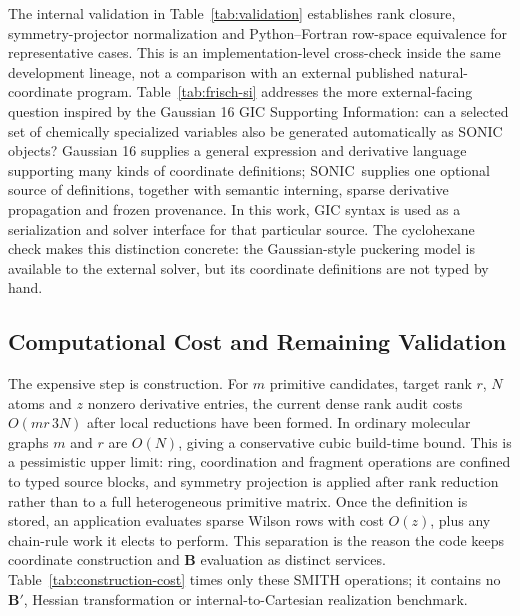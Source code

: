 \documentclass[journal=jctcce,manuscript=article,layout=traditional]{achemso}
\newcommand{\SONIC}{SONIC}
\newcommand{\Bmat}{\mathbf{B}}
\theoremstyle{definition}
\begin{document}
The internal validation in Table~\ref{tab:validation} establishes rank closure,
symmetry-projector normalization and Python--Fortran row-space equivalence for
representative cases.  This is an implementation-level cross-check inside
the same development lineage, not a comparison with an external published
natural-coordinate program.  Table~\ref{tab:frisch-si} addresses the more
external-facing question inspired by the Gaussian 16 GIC Supporting Information:
can a selected set of chemically specialized variables also be generated
automatically as SONIC objects?  Gaussian 16 supplies a general expression and
derivative language supporting many kinds of coordinate definitions; \SONIC\
supplies one optional source of definitions, together with semantic interning,
sparse derivative propagation and frozen provenance.  In this work, GIC syntax
is used as a serialization and solver interface for that particular source.  The
cyclohexane check makes this distinction concrete: the Gaussian-style puckering
model is available to the external solver, but its coordinate definitions are
not typed by hand.

\subsection{Computational Cost and Remaining Validation}

The expensive step is construction.  For \(m\) primitive candidates, target rank
\(r\), \(N\) atoms and \(z\) nonzero derivative entries, the current dense rank
audit costs \(O(mr\,3N)\) after local reductions have been formed.  In ordinary
molecular graphs \(m\) and \(r\) are \(O(N)\), giving a conservative cubic
build-time bound.  This is a pessimistic upper limit: ring, coordination and
fragment operations are confined to typed source blocks, and symmetry projection
is applied after rank reduction rather than to a full heterogeneous primitive
matrix.  Once the definition is stored, an application evaluates sparse Wilson
rows with cost \(O(z)\), plus any chain-rule work it elects to perform.  This
separation is the reason the code keeps coordinate construction and
\(\Bmat\) evaluation as distinct services.  Table~\ref{tab:construction-cost}
times only these SMITH operations; it contains no \(\Bmat'\), Hessian
transformation or internal-to-Cartesian realization benchmark.
\end{document}
